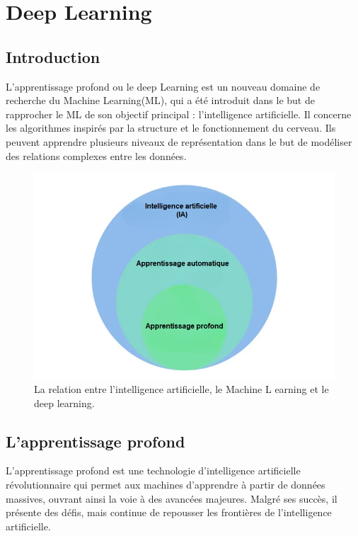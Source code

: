 \chapter{Deep Learning}

\section{Introduction }
L’apprentissage profond ou le deep Learning est un nouveau domaine de recherche du Machine Learning(ML), qui a été introduit dans le but de rapprocher le ML de son objectif principal : l’intelligence artificielle.
 Il concerne les algorithmes inspirés par la structure et le fonctionnement du cerveau. 
 Ils peuvent apprendre plusieurs niveaux de représentation dans le but de modéliser des relations complexes entre les données.
 
 \begin{figure}[h]
\centering
\includegraphics[scale=0.9]{Images/ia reglo.png}
\caption{La relation entre l’intelligence artificielle, le Machine L earning et le deep learning.}
\label{fig:08}
\end{figure} 
 
 \section{L’apprentissage profond }
 L'apprentissage profond est une technologie d'intelligence artificielle révolutionnaire qui permet aux machines d'apprendre à partir de données massives, ouvrant ainsi la voie à des avancées majeures. Malgré ses succès, il présente des défis, mais continue de repousser les frontières de l'intelligence artificielle.
 
